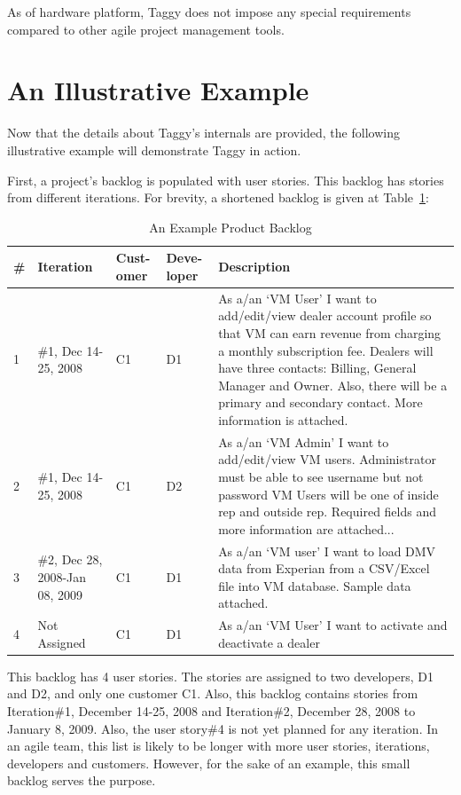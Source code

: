 As of hardware platform, Taggy does not impose any special requirements compared to other agile project management tools.

\section{An Illustrative Example}	
Now that the details about Taggy's internals are provided, the following illustrative example will demonstrate Taggy in action.

First, a project's backlog is populated with user stories. This backlog has stories from different iterations. For brevity, a shortened backlog is given at Table~\ref{tab:backlog}:

\begin{table}[h!]
  \centering
  \caption{An Example Product Backlog}
    \begin{tabular}{|p{0.5cm}|p{1.7cm}|p{1.2cm}|p{1.2cm}|p{9cm}|}
      \hline
      \textbf{\#} & \textbf{Iteration} & \textbf{Cust- omer} & \textbf{Deve- loper} & \textbf{Description}\\
      \hline
		1 & \#1, Dec 14-25, 2008 & C1 & D1 & As a/an `VM User' I want to add/edit/view dealer account profile so that VM can earn revenue from charging a monthly subscription fee.
			Dealers will have three contacts: Billing, General Manager and Owner. Also, there will be a primary and secondary contact. More information is attached.\\
      \hline
		2 & \#1, Dec 14-25, 2008 & C1 & D2 & As a/an `VM Admin' I want to add/edit/view VM users. 
		Administrator must be able to see username but not password VM Users will be one of inside rep and outside rep. 
		Required fields and more information are attached...\\
	  \hline
		3 & \#2, Dec 28, 2008-Jan 08, 2009 & C1 & D1 & As a/an `VM user' I want to load DMV data from Experian from a CSV/Excel file into VM database. Sample data attached.\\
	  \hline
		4 & Not Assigned & C1 & D1 & As a/an `VM User' I want to activate and deactivate a dealer\\
	  \hline
    \end{tabular}
		\label{tab:backlog}
\end{table}

This backlog has 4 user stories. The stories are assigned to two developers, D1 and D2, and only one customer C1. Also, this backlog contains stories from Iteration\#1, December 14-25, 2008 and Iteration\#2, December 28, 2008 to January 8, 2009. Also, the user story\#4 is not yet planned for any iteration. In an agile team, this list is likely to be longer with more user stories, iterations, developers and customers. However, for the sake of an example, this small backlog serves the purpose.

